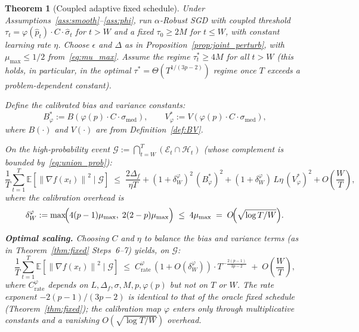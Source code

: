 \documentclass[11pt]{article}
\newtheorem{theorem}{Theorem}
\theoremstyle{definition}
\newcommand{\E}{\mathbb{E}}
\newcommand{\norm}[1]{\left\| #1 \right\|}
\newcommand{\phat}{\hat{p}}
\newcommand{\shat}{\hat{\sigma}}
\begin{document}
\begin{theorem}[Coupled adaptive fixed schedule]\label{thm:coupled}
Under Assumptions~\ref{ass:smooth}--\ref{ass:phi}, run $\alpha$-Robust SGD
with coupled threshold $\tau_t = \varphi(\phat_t)\cdot C\cdot \shat_t$ for
$t > W$ and a fixed $\tau_0 \geq 2M$ for $t \leq W$, with constant learning
rate $\eta$. Choose $\epsilon$ and $\Delta$ as in
Proposition~\ref{prop:joint_perturb}, with $\mu_{\max} \leq 1/2$ from~\eqref{eq:mu_max}.
Assume the regime $\tau_t^{*} \geq 4M$ for all $t > W$ (this holds, in
particular, in the optimal $\tau^{*} = \Theta(T^{1/(3p-2)})$ regime once $T$
exceeds a problem-dependent constant).

Define the calibrated bias and variance constants:
\[
  B^{*}_\varphi := B(\varphi(p)\cdot C\cdot \sigma_{\mathrm{med}}),
  \qquad
  V^{*}_\varphi := V(\varphi(p)\cdot C\cdot \sigma_{\mathrm{med}}),
\]
where $B(\cdot)$ and $V(\cdot)$ are from Definition~\ref{def:BV}.

On the high-probability event $\mathcal{G} := \bigcap_{t=W}^T (\mathcal{E}_t \cap \mathcal{H}_t)$
\textup{(}whose complement is bounded by~\eqref{eq:union_prob}\textup{)}:
\begin{equation}\label{eq:coupled_bound}
  \frac{1}{T}\sum_{t=1}^T \E\!\left[\norm{\nabla f(x_t)}^2 \;\Big|\; \mathcal{G}\right]
  \;\leq\;
    \frac{2\Delta_f}{\eta T}
    + (1 + \delta_W^\varphi)^2\,(B^{*}_\varphi)^2
    + (1 + \delta_W^\varphi)\, L\eta\,(V^{*}_\varphi)^2
    + O\!\left(\frac{W}{T}\right),
\end{equation}
where the calibration overhead is
\begin{equation}\label{eq:delta_W_phi}
  \delta_W^\varphi
  := \max\!\Bigl(4(p-1)\mu_{\max},\; 2(2-p)\mu_{\max}\Bigr)
  \;\leq\; 4\mu_{\max}
  \;=\; O\!\Bigl(\sqrt{\log T/W}\Bigr).
\end{equation}

\medskip
\textbf{Optimal scaling.}
Choosing $C$ and $\eta$ to balance the bias and variance terms (as in
Theorem~\ref{thm:fixed} Steps~6--7) yields, on $\mathcal{G}$:
\begin{equation}\label{eq:coupled_rate}
  \frac{1}{T}\sum_{t=1}^T \E\!\left[\norm{\nabla f(x_t)}^2 \;\Big|\; \mathcal{G}\right]
  \;\leq\;
    C_{\mathrm{rate}}^{\varphi}\,(1 + O(\delta_W^\varphi))
    \cdot T^{-\frac{2(p-1)}{3p-2}}
    \;+\; O\!\left(\frac{W}{T}\right),
\end{equation}
where $C_{\mathrm{rate}}^{\varphi}$ depends on $L, \Delta_f, \sigma, M, p, \varphi(p)$
but not on $T$ or $W$. The rate exponent $-2(p-1)/(3p-2)$ is identical to
that of the oracle fixed schedule (Theorem~\ref{thm:fixed}); the calibration
map $\varphi$ enters only through multiplicative constants and a vanishing
$O(\sqrt{\log T/W})$ overhead.
\end{theorem}
\end{document}
